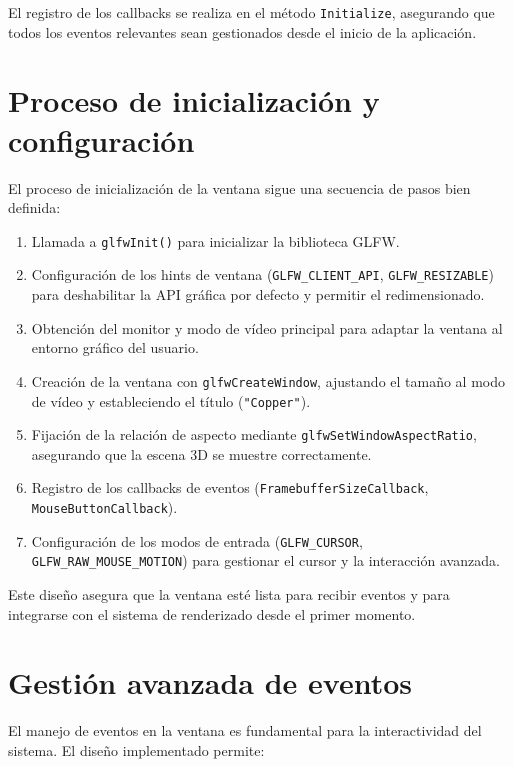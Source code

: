 El registro de los callbacks se realiza en el método \texttt{Initialize},
asegurando que todos los eventos relevantes sean gestionados desde el inicio de
la aplicación.

\section{Proceso de inicialización y configuración}

El proceso de inicialización de la ventana sigue una secuencia de pasos bien
definida:

\begin{enumerate}
    \item Llamada a \texttt{glfwInit()} para inicializar la biblioteca GLFW.
    \item Configuración de los hints de ventana (\texttt{GLFW\_CLIENT\_API},
          \texttt{GLFW\_RESIZABLE}) para deshabilitar la API gráfica por defecto y
          permitir el redimensionado.
    \item Obtención del monitor y modo de vídeo principal para adaptar la ventana al
          entorno gráfico del usuario.
    \item Creación de la ventana con \texttt{glfwCreateWindow}, ajustando el tamaño al
          modo de vídeo y estableciendo el título (\texttt{"Copper"}).
    \item Fijación de la relación de aspecto mediante \texttt{glfwSetWindowAspectRatio},
          asegurando que la escena 3D se muestre correctamente.
    \item Registro de los callbacks de eventos (\texttt{FramebufferSizeCallback},
          \texttt{MouseButtonCallback}).
    \item Configuración de los modos de entrada (\texttt{GLFW\_CURSOR},
          \texttt{GLFW\_RAW\_MOUSE\_MOTION}) para gestionar el cursor y la interacción
          avanzada.
\end{enumerate}

Este diseño asegura que la ventana esté lista para recibir eventos y para
integrarse con el sistema de renderizado desde el primer momento.

\section{Gestión avanzada de eventos}

El manejo de eventos en la ventana es fundamental para la interactividad del
sistema. El diseño implementado permite:

